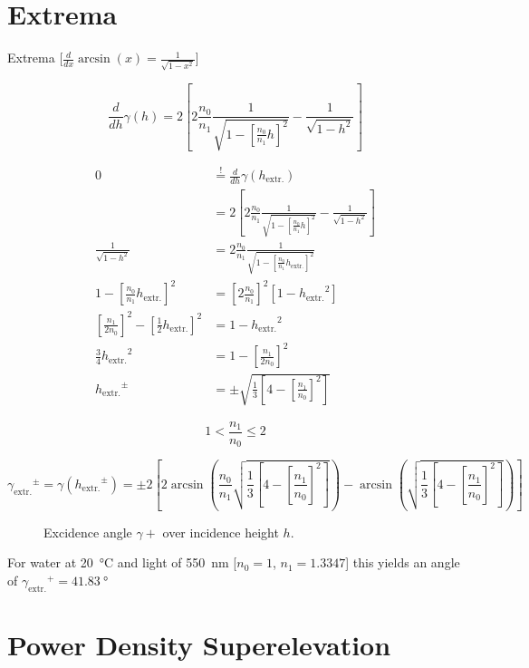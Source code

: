\documentclass[pagesize=pdftex,paper=a4,fontsize=12pt]{scrartcl}
\begin{document}
\section{Extrema}

Extrema [$\frac{d}{dx} \arcsin(x) = \frac{1}{\sqrt{1-x^2}}$]

\[ \frac{d}{dh} \gamma (h) = 2 \left[2 \frac{n_0}{n_1} \frac{1}{\sqrt{1-[\frac{n_0}{n_1} h]^2}} - \frac{1}{\sqrt{1-h^2}}\right] \]

\newcommand{\hExtremum}{\ensuremath{h_{\text{extr.}}}}
\newcommand{\gammaExtremum}{\ensuremath{\gamma_{\text{extr.}}}}
\begin{align}
	0 & \stackrel{!}{=} \frac{d}{dh} \gamma (\hExtremum)\\
 & = 2 \left[2 \frac{n_0}{n_1} \frac{1}{\sqrt{1-[\frac{n_0}{n_1} h]^2}} - \frac{1}{\sqrt{1-h^2}}\right] \nonumber \\[.5em]
	\frac{1}{\sqrt{1-h^2}} &= 2 \frac{n_0}{n_1} \frac{1}{\sqrt{1-[\frac{n_0}{n_1} \hExtremum]^2}} \nonumber \\[.5em]
	1-\left[\frac{n_0}{n_1} \hExtremum\right]^2 &= \left[2 \frac{n_0}{n_1}\right]^2 \left[1-\hExtremum^2\right] \nonumber \\[.5em]
	\left[\frac{n_1}{2 n_0}\right]^2 -\left[\frac{1}{2} \hExtremum\right]^2 &=  1-\hExtremum^2 \nonumber \\[.5em]
	\frac{3}{4} \hExtremum^2 &=  1 - \left[\frac{n_1}{2 n_0}\right]^2 \nonumber \\[.5em]
	\hExtremum^{\pm} &= \pm \sqrt{\frac{1}{3} \left[4 - \left[\frac{n_1}{n_0}\right]^2\right]}
\end{align}

\begin{equation}
	 1 < \frac{n_1}{n_0} \leq 2
\end{equation}

\begin{equation}
	\gammaExtremum^{\pm} = \gamma (\hExtremum^{\pm}) = \pm 2 \left[2 \arcsin\left(\frac{n_0}{n_1} \sqrt{\frac{1}{3} \left[4 - \left[\frac{n_1}{n_0}\right]^2\right]}\right) - \arcsin\left(\sqrt{\frac{1}{3} \left[4 - \left[\frac{n_1}{n_0}\right]^2\right]}\right)\right]
\end{equation}


\begin{figure}[h!]
	\centering
	\caption{Excidence angle $\gamma{+}$ over incidence height $h$.}
	\label{fig:GammaMaxOverRefractiveIndexRelation}
\end{figure}

For water at \SI{20}{\degreeCelsius} and light of \SI{550}{\nano\meter} [$n_0 = 1$, $n_1 = 1.3347$] this yields an angle of $\gammaExtremum^{+} = \SI{41.83}{\degree}$


\section{Power Density Superelevation}
\end{document}
